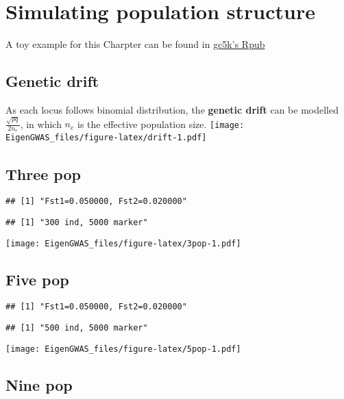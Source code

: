 \documentclass[]{book}
\begin{document}
\hypertarget{simulating-population-structure}{%
\chapter{Simulating population
structure}\label{simulating-population-structure}}

A toy example for this Charpter can be found in
\href{http://rpubs.com/gc5k/EigenGWAScore}{gc5k's Rpub}

\hypertarget{genetic-drift}{%
\section{Genetic drift}\label{genetic-drift}}

As each locus follows binomial distribution, the \textbf{genetic drift}
can be modelled \(\frac{\sqrt{pq}}{2n_e}\), in which \(n_e\) is the
effective population size.
\texttt{[image: EigenGWAS\_files/figure-latex/drift-1.pdf]}

\hypertarget{three-pop}{%
\section{Three pop}\label{three-pop}}

\begin{verbatim}
## [1] "Fst1=0.050000, Fst2=0.020000"
\end{verbatim}

\begin{verbatim}
## [1] "300 ind, 5000 marker"
\end{verbatim}

\texttt{[image: EigenGWAS\_files/figure-latex/3pop-1.pdf]}

\hypertarget{five-pop}{%
\section{Five pop}\label{five-pop}}

\begin{verbatim}
## [1] "Fst1=0.050000, Fst2=0.020000"
\end{verbatim}

\begin{verbatim}
## [1] "500 ind, 5000 marker"
\end{verbatim}

\texttt{[image: EigenGWAS\_files/figure-latex/5pop-1.pdf]}

\hypertarget{nine-pop}{%
\section{Nine pop}\label{nine-pop}}
\end{document}
